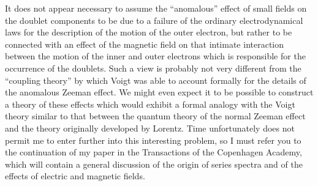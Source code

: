 It does not appear necessary to assume the ``anomalous'' effect
of small fields on the doublet components to be due to a failure of
the ordinary electrodynamical laws for the description of the motion
of the outer electron, but rather to be connected with an effect of
the magnetic field on that intimate interaction between the motion
of the inner and outer electrons which is responsible for the occurrence
of the doublets. Such a view is probably not very different
from the ``coupling theory'' by which Voigt was able to account
formally for the details of the anomalous Zeeman effect. We might
even expect it to be possible to construct a theory of these effects
which would exhibit a formal analogy with the Voigt theory similar
to that between the quantum theory of the normal Zeeman effect and
the theory originally developed by Lorentz. Time unfortunately
does not permit me to enter further into this interesting problem, so
I must refer you to the continuation of my paper in the Transactions
of the Copenhagen Academy, which will contain a general discussion
of the origin of series spectra and of the effects of electric and
magnetic fields.



